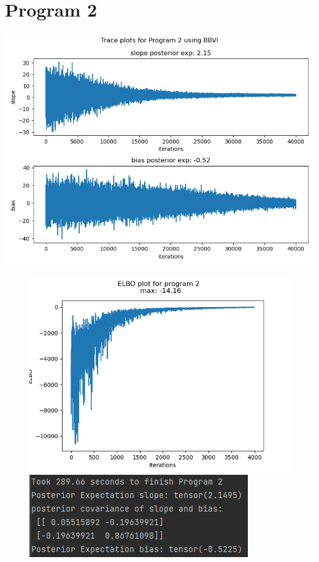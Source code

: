 \documentclass[10pt]{homeworg}
\begin{document}
\section{Program 2}
\begin{center}
\includegraphics[scale=0.5]{figures/BBVI_program_2.png}
\end{center}

\begin{figure}[!htbp]
    \centering
    \begin{minipage}{0.45\textwidth}
        \centering
       \includegraphics[scale=0.5]{figures/elbo_program_2.png}
    \end{minipage}\hfill
    \begin{minipage}{0.45\textwidth}
        \centering
        \includegraphics[scale=0.8]{figures/program2_time.png}
    \end{minipage}
\end{figure}
\end{document}
